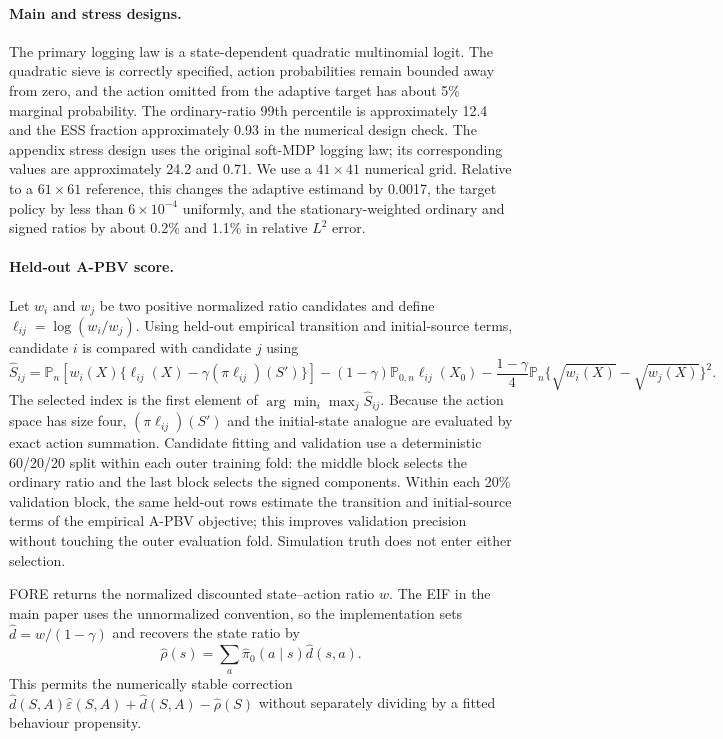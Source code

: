 \documentclass[11pt]{article}
\theoremstyle{plain}
\begin{document}
\paragraph{Main and stress designs.}
The primary logging law is a state-dependent quadratic multinomial logit. The
quadratic sieve is correctly specified, action probabilities remain bounded
away from zero, and the action omitted from the adaptive target has about 5\%
marginal probability. The ordinary-ratio 99th percentile is approximately 12.4
and the ESS fraction approximately 0.93 in the numerical design check. The
appendix stress design uses the original soft-MDP logging law; its corresponding
values are approximately 24.2 and 0.71. We use a $41\times41$ numerical grid.
Relative to a $61\times61$ reference, this changes the adaptive estimand by
0.0017, the target policy by less than $6\times10^{-4}$ uniformly, and the
stationary-weighted ordinary and signed ratios by about 0.2\% and 1.1\% in
relative $L^2$ error.

\paragraph{Held-out A-PBV score.}
Let $w_i$ and $w_j$ be two positive normalized ratio candidates and define
$\ell_{ij}=\log(w_i/w_j)$. Using held-out empirical transition and
initial-source terms, candidate $i$ is compared with candidate $j$ using
\[
\widehat S_{ij}
=\mathbb P_n\!\left[w_i(X)
  \{\ell_{ij}(X)-\gamma(\pi\ell_{ij})(S')\}\right]
 -(1-\gamma)\mathbb P_{0,n}\ell_{ij}(X_0)
 -\frac{1-\gamma}{4}\mathbb P_n
  \{\sqrt{w_i(X)}-\sqrt{w_j(X)}\}^2.
\]
The selected index is the first element of
$\arg\min_i\max_j\widehat S_{ij}$. Because the action space has size four,
$(\pi\ell_{ij})(S')$ and the initial-state analogue are evaluated by exact
action summation. Candidate fitting and validation use a deterministic
60/20/20 split within each outer training fold: the middle block selects the
ordinary ratio and the last block selects the signed components. Within each
20\% validation block, the same held-out rows estimate the transition and
initial-source terms of the empirical A-PBV objective; this improves validation
precision without touching the outer evaluation fold. Simulation truth does not
enter either selection.

FORE returns the normalized discounted state--action ratio $w$. The EIF in the
main paper uses the unnormalized convention, so the implementation sets
$\widehat d=w/(1-\gamma)$ and recovers the state ratio by
\[
\widehat\rho(s)=\sum_a\widehat\pi_0(a\mid s)\widehat d(s,a).
\]
This permits the numerically stable correction
$\widehat d(S,A)\widehat\varepsilon(S,A)+\widehat d(S,A)-
\widehat\rho(S)$ without separately dividing by a fitted behaviour propensity.
\end{document}
